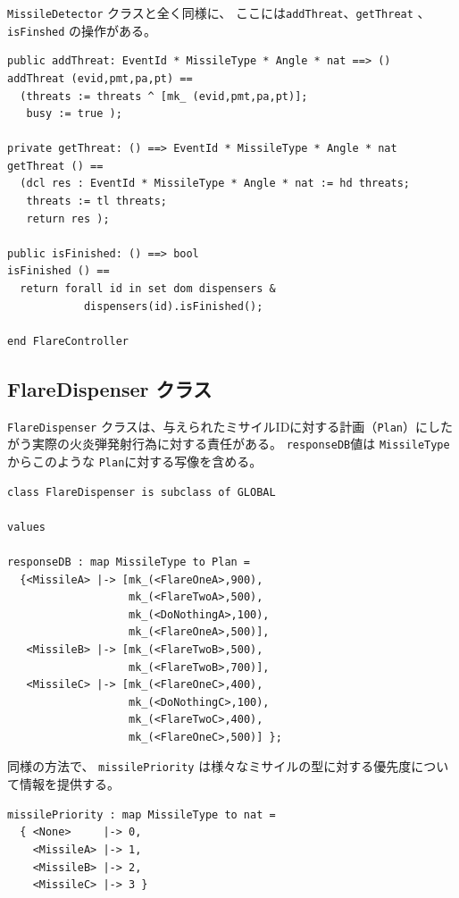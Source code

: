 \documentclass[\pformat,12pt]{jreport}
\begin{document}
 \texttt{MissileDetector} クラスと全く同様に、 ここには\texttt{addThreat}、\texttt{getThreat} 、\texttt{isFinshed} の操作がある。

\begin{lstlisting}
public addThreat: EventId * MissileType * Angle * nat ==> ()
addThreat (evid,pmt,pa,pt) ==
  (threats := threats ^ [mk_ (evid,pmt,pa,pt)];
   busy := true );

private getThreat: () ==> EventId * MissileType * Angle * nat
getThreat () ==
  (dcl res : EventId * MissileType * Angle * nat := hd threats;
   threats := tl threats;
   return res );

public isFinished: () ==> bool
isFinished () ==
  return forall id in set dom dispensers &
            dispensers(id).isFinished();

end FlareController
\end{lstlisting}

\subsection{FlareDispenser クラス}

  \texttt{FlareDispenser} クラスは、与えられたミサイルIDに対する計画（\texttt{Plan}）にしたがう実際の火炎弾発射行為に対する責任がある。
 \texttt{responseDB}値は \texttt{MissileType} からこのような \texttt{Plan}に対する写像を含める。

\begin{lstlisting}
class FlareDispenser is subclass of GLOBAL

values

responseDB : map MissileType to Plan =
  {<MissileA> |-> [mk_(<FlareOneA>,900),
                   mk_(<FlareTwoA>,500),
                   mk_(<DoNothingA>,100),
                   mk_(<FlareOneA>,500)],
   <MissileB> |-> [mk_(<FlareTwoB>,500),
                   mk_(<FlareTwoB>,700)],
   <MissileC> |-> [mk_(<FlareOneC>,400),
                   mk_(<DoNothingC>,100),
                   mk_(<FlareTwoC>,400),
                   mk_(<FlareOneC>,500)] };
\end{lstlisting}

同様の方法で、 \texttt{missilePriority} は様々なミサイルの型に対する優先度について情報を提供する。

\begin{lstlisting}
missilePriority : map MissileType to nat =
  { <None>     |-> 0,
    <MissileA> |-> 1,
    <MissileB> |-> 2,
    <MissileC> |-> 3 }
\end{lstlisting}
\end{document}
